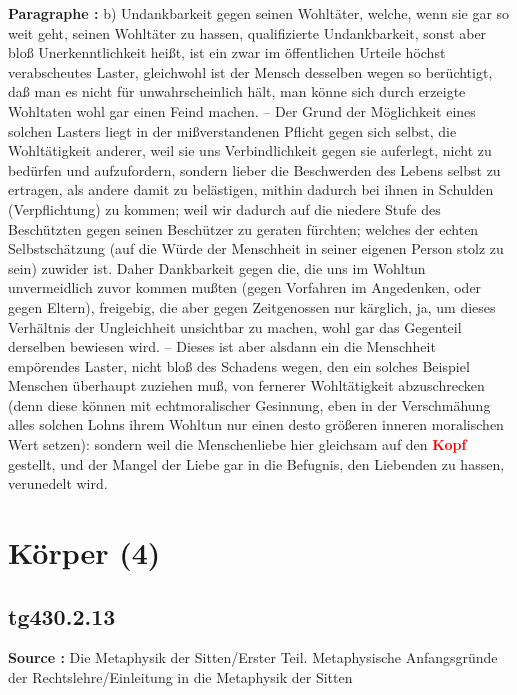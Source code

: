 \documentclass[a4paper,12pt,twoside]{book}
\newcommand{\match}[1]{\textcolor{red}{\textbf{#1}}}
\newcommand{\unnumberedsection}[1]{
	\section*{#1}
	\addcontentsline{toc}{section}{#1}
	\markright{#1}
}
\begin{document}
	\textbf{Paragraphe : }b) Undankbarkeit gegen seinen Wohltäter, welche, wenn sie gar so weit geht, seinen Wohltäter zu hassen, 
	qualifizierte Undankbarkeit, sonst aber bloß Unerkenntlichkeit heißt, ist ein zwar im öffentlichen Urteile höchst verabscheutes Laster, gleichwohl ist der Mensch desselben wegen so berüchtigt, daß man es nicht für unwahrscheinlich hält, man könne sich durch erzeigte Wohltaten wohl gar einen Feind machen. – Der Grund der Möglichkeit eines solchen Lasters liegt in der mißverstandenen Pflicht gegen sich selbst, die Wohltätigkeit anderer, weil sie uns Verbindlichkeit gegen sie auferlegt, nicht zu bedürfen und aufzufordern, sondern lieber die Beschwerden des Lebens selbst zu ertragen, als andere damit zu belästigen, mithin dadurch bei ihnen in Schulden (Verpflichtung) zu kommen; weil wir dadurch auf die niedere Stufe des Beschützten gegen seinen Beschützer zu geraten fürchten; welches der echten Selbstschätzung (auf die Würde der Menschheit in seiner eigenen Person stolz zu sein) zuwider ist. Daher Dankbarkeit gegen die, die uns im Wohltun unvermeidlich zuvor kommen mußten (gegen Vorfahren im Angedenken, oder gegen Eltern), freigebig, die aber gegen Zeitgenossen nur kärglich, ja, um dieses Verhältnis der Ungleichheit unsichtbar zu machen, wohl gar das Gegenteil derselben bewiesen wird. – Dieses ist aber alsdann ein die Menschheit empörendes Laster, nicht bloß des Schadens wegen, den ein solches Beispiel Menschen überhaupt zuziehen muß, von fernerer Wohltätigkeit abzuschrecken (denn diese können mit echtmoralischer Gesinnung, eben in der Verschmähung alles solchen Lohns ihrem Wohltun nur einen desto größeren inneren moralischen Wert setzen): sondern weil die Menschenliebe hier gleichsam auf den \match{Kopf} gestellt, und der Mangel der Liebe gar in die Befugnis, den Liebenden zu hassen, verunedelt wird. 
	
	\unnumberedsection{Körper (4)} 
	\subsection*{tg430.2.13} 
	\textbf{Source : }Die Metaphysik der Sitten/Erster Teil. Metaphysische Anfangsgründe der Rechtslehre/Einleitung in die Metaphysik der Sitten\\  
	
\end{document}
